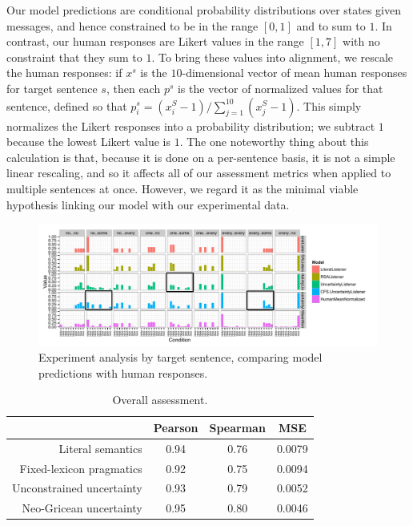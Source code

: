 \documentclass[leqno,12pt]{article}
\begin{document}

Our model predictions are conditional probability distributions over
states given messages, and hence constrained to be in the range
$[0,1]$ and to sum to $1$. In contrast, our human responses are Likert
values in the range $[1,7]$ with no constraint that they sum to
$1$. To bring these values into alignment, we rescale the human
responses: if $x^{s}$ is the $10$-dimensional vector of mean human
responses for target sentence $s$, then each $p^{s}$ is the vector of
normalized values for that sentence, defined so that $p^{s}_{i} =
(x^{S}_{i}-1)/\sum_{j=1}^{10}(x^{S}_{j}-1)$. This simply normalizes
the Likert responses into a probability distribution; we subtract $1$
because the lowest Likert value is $1$. The one noteworthy thing about
this calculation is that, because it is done on a per-sentence basis,
it is not a simple linear rescaling, and so it affects all of our
assessment metrics when applied to multiple sentences at
once. However, we regard it as the minimal viable hypothesis linking
our model with our experimental data.

\begin{figure}[t]
  \centering
  \includegraphics[width=1\textwidth]{fig/allmodels2}
  \caption{Experiment analysis by target sentence, 
    comparing model predictions with human responses.}
  \label{fig:exp-analysis}
\end{figure}

\begin{table}[th!]
  \centering
  \begin{tabular}[c]{r c c c}
    \toprule
    & Pearson & Spearman & MSE \\
    \midrule
    Literal semantics         & 0.94 & 0.76 & 0.0079\\
    Fixed-lexicon pragmatics  & 0.92 & 0.75 & 0.0094\\
    Unconstrained uncertainty & 0.93 & 0.79 & 0.0052\\
    Neo-Gricean uncertainty   & 0.95 & 0.80 & 0.0046\\
    \bottomrule   
  \end{tabular}
  \caption{Overall assessment.}
  \label{tab:overall}
\end{table}
\end{document}
